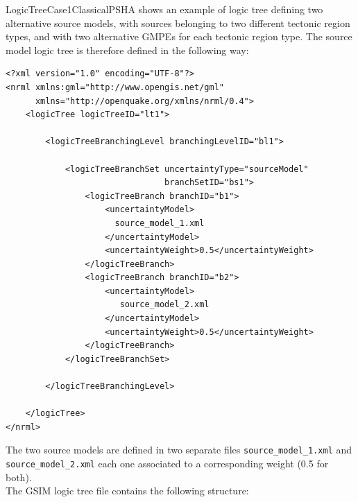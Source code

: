 LogicTreeCase1ClassicalPSHA shows an example of logic tree defining two 
alternative source models, with sources belonging to two different
tectonic region types, and with two alternative GMPEs for each tectonic 
region type.
The source model logic tree is therefore defined in the following way:
\begin{Verbatim}[frame=single, commandchars=\\\{\}, fontsize=\normalsize]
<?xml version="1.0" encoding="UTF-8"?>
<nrml xmlns:gml="http://www.opengis.net/gml"
      xmlns="http://openquake.org/xmlns/nrml/0.4">
    <logicTree logicTreeID="lt1">

        <logicTreeBranchingLevel branchingLevelID="bl1">

            <logicTreeBranchSet uncertaintyType="sourceModel"
                                branchSetID="bs1">
                <logicTreeBranch branchID="b1">
                    <uncertaintyModel>
                      source_model_1.xml
                    </uncertaintyModel>
                    <uncertaintyWeight>0.5</uncertaintyWeight>
                </logicTreeBranch>
                <logicTreeBranch branchID="b2">
                    <uncertaintyModel>
                       source_model_2.xml
                    </uncertaintyModel>
                    <uncertaintyWeight>0.5</uncertaintyWeight>
                </logicTreeBranch>
            </logicTreeBranchSet>

        </logicTreeBranchingLevel>

    </logicTree>
</nrml>
\end{Verbatim}
The two source models are defined in two separate files 
\texttt{source\_\-model\_\-1.xml} and \texttt{source\_\-model\_\-2.xml} each
one associated to a corresponding weight (0.5 for both).\\
The GSIM logic tree file contains the following structure:
